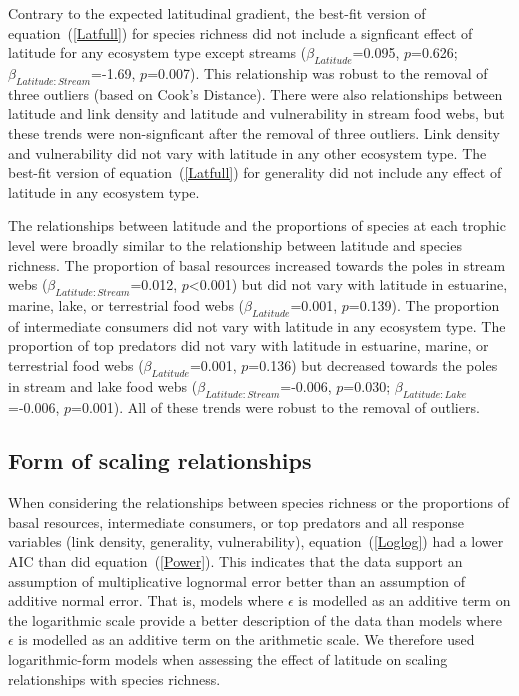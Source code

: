 \documentclass[12pt]{article}
\begin{document}
\begin{spacing}{1.0}
    Contrary to the expected latitudinal gradient, the best-fit version of
    equation~(\ref{Latfull}) for species richness did not include a signficant effect of latitude for any ecosystem type except streams
    ($\beta_{Latitude}$=0.095, $p$=0.626; $\beta_{Latitude:Stream}$=-1.69, $p$=0.007).  This
    relationship was robust to the removal of three outliers (based on Cook's Distance). 
    There were also relationships between latitude and link density and latitude and vulnerability
    in stream food webs, but these trends were non-signficant after the removal of three outliers.
    Link density and vulnerability did not vary with latitude in any other ecosystem type.
    The best-fit version of equation~(\ref{Latfull}) for generality did not include any effect of
    latitude in any ecosystem type. 


    The relationships between latitude and the proportions of species at each trophic level were broadly similar
    to the relationship between latitude and species richness. 
    The proportion of basal resources increased towards the poles in stream webs ($\beta_{Latitude:Stream}$=0.012, $p$\textless0.001) 
    but did not vary with latitude in estuarine, marine, lake, or terrestrial 
    food webs ($\beta_{Latitude}$=0.001, $p$=0.139).
    The proportion of intermediate consumers did not vary with latitude in any ecosystem type.
    The proportion of top predators did not vary with latitude in 
    estuarine, marine, or terrestrial food webs ($\beta_{Latitude}$=0.001, $p$=0.136) but decreased towards the poles in stream and lake food 
    webs ($\beta_{Latitude:Stream}$=-0.006, $p$=0.030; 
    $\beta_{Latitude:Lake}$=-0.006, $p$=0.001). 
    All of these trends were robust to the removal of outliers.


  \subsection*{Form of scaling relationships}

    When considering the relationships between species richness or the proportions 
    of basal resources, intermediate consumers, or top predators and all response variables 
    (link density, generality, vulnerability), equation~(\ref{Loglog}) had a
    lower AIC than did equation~(\ref{Power}). This indicates that the
    data support an assumption of multiplicative lognormal error better than an
    assumption of additive normal error. That is, models where $\epsilon$ is
    modelled as an additive term on
    the logarithmic scale provide a better description of the data than models
    where $\epsilon$ is modelled as an additive term on the arithmetic scale.  
    We therefore used logarithmic-form models when assessing the
    effect of latitude on scaling relationships  with species richness.



\end{spacing}
\end{document}
